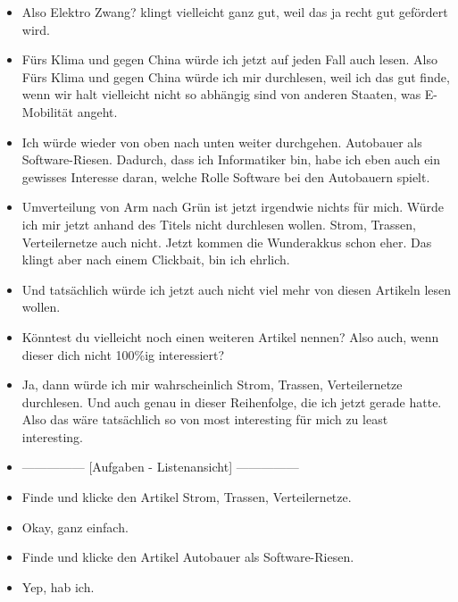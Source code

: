 {\begin{itemize}[]
            \item {} Also \flqq Elektro Zwang?\frqq{} klingt vielleicht ganz gut, weil das ja recht gut gefördert wird.
            \item {} \flqq Fürs Klima und gegen China\frqq{} würde ich jetzt auf jeden Fall auch lesen.
                  Also \flqq Fürs Klima und gegen China\frqq{} würde ich mir durchlesen, weil ich das gut finde, wenn wir halt vielleicht nicht so abhängig sind von anderen Staaten, was E-Mobilität angeht.
            \item {} Ich würde wieder von oben nach unten weiter durchgehen.
                  \flqq Autobauer als Software-Riesen\frqq{}.
                  Dadurch, dass ich Informatiker bin, habe ich eben auch ein gewisses Interesse daran, welche Rolle Software bei den Autobauern spielt.
            \item {} \flqq Umverteilung von Arm nach Grün\frqq{} ist jetzt irgendwie nichts für mich. Würde ich mir jetzt anhand des Titels nicht durchlesen wollen.
                  \flqq Strom, Trassen, Verteilernetze\frqq{} auch nicht.
                  \flqq Jetzt kommen die Wunderakkus\frqq{} schon eher.
                  Das klingt aber nach einem Clickbait, bin ich ehrlich.
            \item {} Und tatsächlich würde ich jetzt auch nicht viel mehr von diesen Artikeln lesen wollen.
            \item {} Könntest du vielleicht noch einen weiteren Artikel nennen? Also auch, wenn dieser dich nicht 100\%ig interessiert?
            \item {} Ja, dann würde ich mir wahrscheinlich \flqq Strom, Trassen, Verteilernetze\frqq{} durchlesen.
                  Und auch genau in dieser Reihenfolge, die ich jetzt gerade hatte.
                  Also das wäre tatsächlich so von most interesting für mich zu least interesting.
            \item {---------------} [Aufgaben - Listenansicht] {---------------}
            \item {} Finde und klicke den Artikel \flqq Strom, Trassen, Verteilernetze\frqq{}.
            \item {} Okay, ganz einfach.
            \item {} Finde und klicke den Artikel \flqq Autobauer als Software-Riesen\frqq{}.
            \item {} Yep, hab ich.

\end{itemize}}
